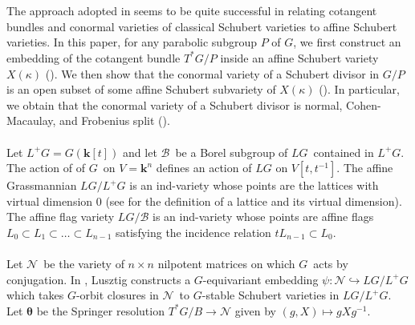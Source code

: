 \documentclass[paper=a4, fontsize=10pt]{amsart} %
\theoremstyle{plain}
\theoremstyle{definition}
\theoremstyle{remark}
\numberwithin{equation}{section} %
\numberwithin{figure}{section} %
\numberwithin{table}{section} %
\numberwithin{subsection}{section} %
\def\Borel{\ensuremath{\mathcal B}}
\def\gl{\ensuremath{G}}
\def\gL{\ensuremath{L\gl}}
\def\gLhat{\gL}
\def\gOhat{\ensuremath{L^+\gl}}
\def\gO{\gOhat}
\def\Ni{\ensuremath{\mathcal N}}
\begin{document}
\\
\\
The approach adopted in \cite{vl,rv} seems to be quite successful in relating cotangent bundles and conormal varieties of classical Schubert varieties to affine Schubert varieties.
In this paper, for any parabolic subgroup $P$ of $G$, we first construct an embedding of the cotangent bundle $T^*G/P$ inside an affine Schubert variety $X(\kappa)$ ().
We then show that the conormal variety of a Schubert divisor in $G/P$ is an open subset of some affine Schubert subvariety of $X(\kappa)$ ().
In particular, we obtain that the conormal variety of a Schubert divisor is normal, Cohen-Macaulay, and Frobenius split ().
\\
\\
\newif\ifminuscule
\minusculefalse
Let $\gO=G\left(\mathbf k[t]\right)$ and let \Borel\ be a Borel subgroup of \gLhat\ contained in \gO. 
The action of of \gl\ on $V=\mathbf k^n$ defines an action of $\gLhat$ on $V[t,t^{-1}]$. 
The affine Grassmannian $\gLhat/\gOhat$ is an ind-variety whose points are the lattices with virtual dimension $0$ (see  for the definition of a lattice and its virtual dimension).
The affine flag variety $\gLhat/\Borel$ is an ind-variety whose points are affine flags $L_0\subset L_1\subset\ldots\subset L_{n-1}$ satisfying the incidence relation $tL_{n-1}\subset L_0$.
\\
\\
Let \Ni\ be the variety of $n\times n$ nilpotent matrices on which \gl\ acts by conjugation. 
In \cite{gl:green}, Lusztig constructs a \gl-equivariant embedding $\psi:\Ni\hookrightarrow\gLhat/\gO$ which takes \gl-orbit closures in \Ni\ to \gl-stable Schubert varieties in $\gLhat/\gO$.
Let $\boldsymbol\theta$ be the Springer resolution $T^*G/B\rightarrow\Ni$ given by $(g,X)\mapsto gXg^{-1}$.
\end{document}
